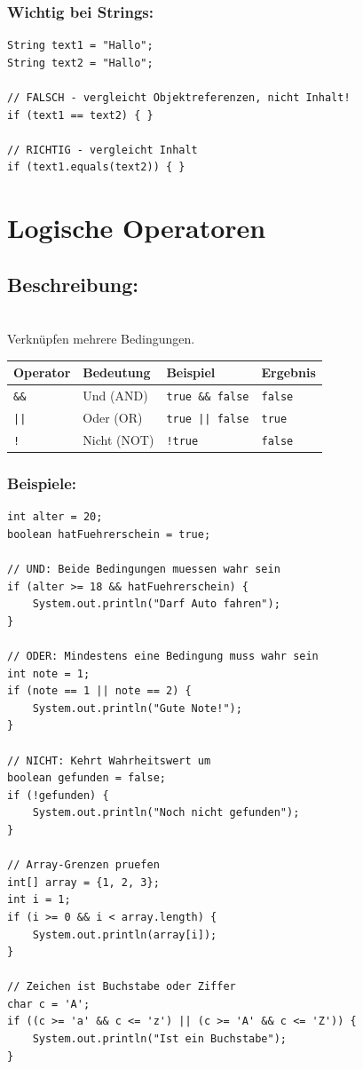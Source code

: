 \subsubsection*{Wichtig bei Strings:}
\begin{lstlisting}
String text1 = "Hallo";
String text2 = "Hallo";

// FALSCH - vergleicht Objektreferenzen, nicht Inhalt!
if (text1 == text2) { }

// RICHTIG - vergleicht Inhalt
if (text1.equals(text2)) { }
\end{lstlisting}

\newpage


\section*{Logische Operatoren}

\subsection*{Beschreibung:}\\
Verknüpfen mehrere Bedingungen.

\begin{center}
	\begin{tabular}{|l|l|l|l|}
		\hline
		\textbf{Operator} & \textbf{Bedeutung} & \textbf{Beispiel} & \textbf{Ergebnis} \\
		\hline
		\texttt{\&\&} & Und (AND) & \texttt{true \&\& false} & \texttt{false} \\
		\hline
		\texttt{||} & Oder (OR) & \texttt{true || false} & \texttt{true} \\
		\hline
		\texttt{!} & Nicht (NOT) & \texttt{!true} & \texttt{false} \\
		\hline
	\end{tabular}
\end{center}

\subsubsection*{Beispiele:}
\begin{lstlisting}
int alter = 20;
boolean hatFuehrerschein = true;

// UND: Beide Bedingungen muessen wahr sein
if (alter >= 18 && hatFuehrerschein) {
    System.out.println("Darf Auto fahren");
}

// ODER: Mindestens eine Bedingung muss wahr sein
int note = 1;
if (note == 1 || note == 2) {
    System.out.println("Gute Note!");
}

// NICHT: Kehrt Wahrheitswert um
boolean gefunden = false;
if (!gefunden) {
    System.out.println("Noch nicht gefunden");
}

// Array-Grenzen pruefen
int[] array = {1, 2, 3};
int i = 1;
if (i >= 0 && i < array.length) {
    System.out.println(array[i]);
}

// Zeichen ist Buchstabe oder Ziffer
char c = 'A';
if ((c >= 'a' && c <= 'z') || (c >= 'A' && c <= 'Z')) {
    System.out.println("Ist ein Buchstabe");
}
\end{lstlisting}

